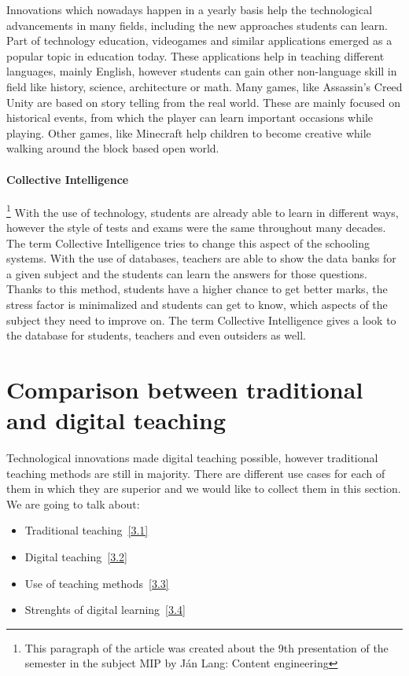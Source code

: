 \documentclass[10pt,oneside,english,a4paper]{article}
\begin{document}
	Innovations which nowadays happen in a yearly basis  help the technological advancements in many fields, including the new approaches students can learn. Part of technology education, videogames and similar applications emerged as a popular topic
in education today\cite{Okur2017}. These applications help in teaching different languages, mainly English, however students can gain other non-language skill in field like history, science, architecture or math. Many games, like Assassin's Creed Unity are based on story telling from the real world. These are mainly focused on historical events, from which the player can learn important occasions while playing. Other games, like Minecraft help children to become creative while walking around the block based open world. 

	\paragraph{Collective Intelligence}\footnote{This paragraph of the article was created about the 9th presentation of the semester in the subject MIP by Ján Lang: Content engineering} With the use of technology, students are already able to learn in different ways, however the style of tests and exams were the same throughout many decades. The term Collective Intelligence tries to change this aspect of the schooling systems. With the use of databases, teachers are able to show the data banks for a given subject and the students can learn the answers for those questions. Thanks to this method, students have a higher chance to get better marks, the stress factor is minimalized and students can  get to know, which aspects of the subject they need to improve on. The term Collective Intelligence gives a look to the database for students, teachers and even outsiders as well.

\section{Comparison between traditional and digital teaching}\label{comparison}

	Technological innovations made digital teaching possible, however traditional teaching methods are still in majority. There are different use cases for each of them in which they are superior and we would like to collect them in this section. We are going to talk about:

\begin{itemize}
\item Traditional teaching~\ref{3.1}
\item Digital teaching~\ref{3.2}
\item Use of teaching methods~\ref{3.3}
\item Strenghts of digital learning~\ref{3.4}
\end{itemize}
\end{document}
